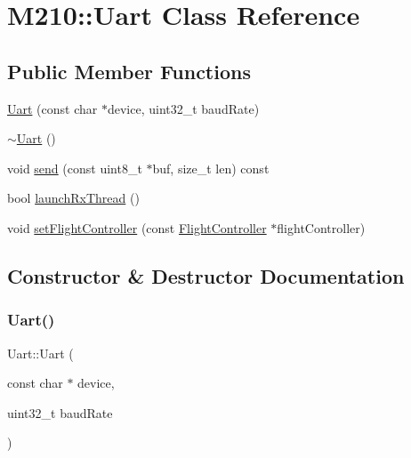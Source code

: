 \hypertarget{class_m210_1_1_uart}{}\section{M210\+:\+:Uart Class Reference}
\label{class_m210_1_1_uart}
\subsection*{Public Member Functions}
\begin{DoxyCompactItemize}
\item 
\mbox{\hyperlink{class_m210_1_1_uart_af1f7108bb9b2519bb0bd6e57990aec07}{Uart}} (const char $\ast$device, uint32\+\_\+t baud\+Rate)
\item 
\mbox{\hyperlink{class_m210_1_1_uart_a7160154094413395a23dbaa287dbef3c}{$\sim$\+Uart}} ()
\item 
void \mbox{\hyperlink{class_m210_1_1_uart_a7aa2fba14c420024a1e2ec9079684def}{send}} (const uint8\+\_\+t $\ast$buf, size\+\_\+t len) const
\item 
bool \mbox{\hyperlink{class_m210_1_1_uart_ad793a587c421c2e8d6bde5d6ddfd95d8}{launch\+Rx\+Thread}} ()
\item 
void \mbox{\hyperlink{class_m210_1_1_uart_a294e7c110b8bb09dd7b4fde43ed1fce4}{set\+Flight\+Controller}} (const \mbox{\hyperlink{class_m210_1_1_flight_controller}{Flight\+Controller}} $\ast$flight\+Controller)
\end{DoxyCompactItemize}


\subsection{Constructor \& Destructor Documentation}
\mbox{\label{class_m210_1_1_uart_af1f7108bb9b2519bb0bd6e57990aec07}} 
\subsubsection{\texorpdfstring{Uart()}{Uart()}}
{\footnotesize\ttfamily Uart\+::\+Uart (\begin{DoxyParamCaption}\item[{const char $\ast$}]{device,  }\item[{uint32\+\_\+t}]{baud\+Rate }\end{DoxyParamCaption})}

